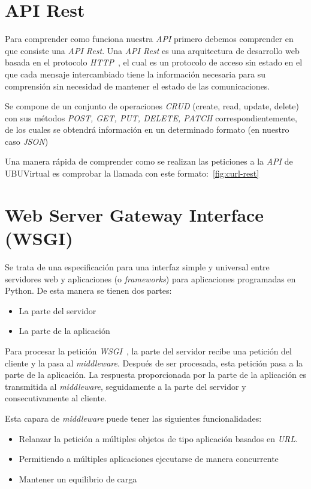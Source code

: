 
\section{API Rest}\label{sec:api-rest}
Para comprender como funciona nuestra \textit{API} primero debemos comprender en que consiste una \textit{API Rest}. Una \textit{API Rest} es una arquitectura de desarrollo web basada en el protocolo \textit{HTTP}~\cite{wiki:http}, el cual es un protocolo de acceso sin estado en el que cada mensaje intercambiado tiene la información necesaria para su comprensión sin necesidad de mantener el estado de las comunicaciones.

Se compone de un conjunto de operaciones \textit{CRUD} (create, read, update, delete) con sus métodos \textit{POST, GET, PUT, DELETE, PATCH} correspondientemente, de los cuales se obtendrá información en un determinado formato (en nuestro caso \textit{JSON})

Una manera rápida de comprender como se realizan las peticiones a la \textit{API} de UBUVirtual es comprobar la llamada con este formato:~\ref{fig:curl-rest}
~\cite{moodle:api-rest-config}

\section{Web Server Gateway Interface (WSGI)}\label{sec:wsgi}
Se trata de una especificación para una interfaz simple y universal entre servidores web y aplicaciones (o \textit{frameworks}) para aplicaciones programadas en Python.
De esta manera se tienen dos partes:
\begin{itemize}
	\item La parte del servidor
	\item La parte de la aplicación
\end{itemize}
Para procesar la petición \textit{WSGI}~\cite{wiki:wsgi}, la parte del servidor recibe una petición del cliente y la pasa al \textit{middleware}. Después de ser procesada, esta petición pasa a la parte de la aplicación. La respuesta proporcionada por la parte de la aplicación es transmitida al \textit{middleware}, seguidamente a la parte del servidor y consecutivamente al cliente.

Esta capara de \textit{middleware} puede tener las siguientes funcionalidades:
\begin{itemize}
	\item Relanzar la petición a múltiples objetos de tipo aplicación basados en \textit{URL}.
	\item Permitiendo a múltiples aplicaciones ejecutarse de manera concurrente
	\item Mantener un equilibrio de carga
\end{itemize}